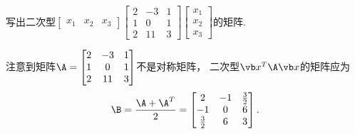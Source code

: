 \begin{example}
写出二次型\(\begin{bmatrix}
	x_1 & x_2 & x_3
\end{bmatrix}
\begin{bmatrix}
	2 & -3 & 1 \\
	1 & 0 & 1 \\
	2 & 11 & 3
\end{bmatrix}
\begin{bmatrix}
	x_1 \\ x_2 \\ x_3
\end{bmatrix}\)的矩阵.
\begin{solution}
注意到矩阵\(\A = \begin{bmatrix}
	2 & -3 & 1 \\
	1 & 0 & 1 \\
	2 & 11 & 3
\end{bmatrix}\)不是对称矩阵，
二次型\(\x^T\A\x\)的矩阵应为\[
	\B
	= \frac{\A+\A^T}{2}
	= \begin{bmatrix}
		2 & -1 & \frac{3}{2} \\
		-1 & 0 & 6 \\
		\frac{3}{2} & 6 & 3
	\end{bmatrix}.
\]
\end{solution}
\end{example}

